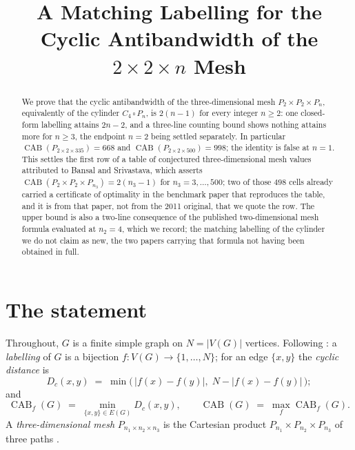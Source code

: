 \documentclass[11pt]{amsart}
\title[Cyclic antibandwidth of $P_2\times P_2\times P_n$]{A Matching Labelling for the Cyclic
Antibandwidth of the \texorpdfstring{$2\times2\times n$}{2x2xn} Mesh}
\date{}
\DeclareMathOperator{\CAB}{CAB}
\newcommand{\Dc}{D_{c}}
\begin{document}
\begin{abstract}
We prove that the cyclic antibandwidth of the three-dimensional mesh $P_2\times P_2\times P_n$,
equivalently of the cylinder $C_4\,\square\,P_n$, is $2(n-1)$ for every integer $n\ge2$: one
closed-form labelling attains $2n-2$, and a three-line counting bound shows nothing attains more
for $n\ge3$, the endpoint $n=2$ being settled separately. In particular
$\CAB(P_{2\times2\times335}) = 668$ and $\CAB(P_{2\times2\times500}) = 998$; the identity is false
at $n=1$. This settles the first row of a table of conjectured three-dimensional mesh values
attributed to Bansal and Srivastava, which asserts
$\CAB(P_2\times P_2\times P_{n_3}) = 2(n_3-1)$ for $n_3 = 3,\dots,500$; two of those $498$ cells
already carried a certificate of optimality in the benchmark paper that reproduces the table, and
it is from that paper, not from the 2011 original, that we quote the row. The upper bound is also a
two-line consequence of the published two-dimensional mesh formula evaluated at $n_2 = 4$, which we
record; the matching labelling of the cylinder we do not claim as new, the two papers carrying that
formula not having been obtained in full.
\end{abstract}

\maketitle

\section{The statement}

Throughout, $G$ is a finite simple graph on $N = |V(G)|$ vertices. Following
\cite[\S2.1]{SAT2026}: a \emph{labelling} of $G$ is a bijection $f\colon V(G)\to\{1,\dots,N\}$; for
an edge $\{x,y\}$ the \emph{cyclic distance} is
\[
  \Dc(x,y) \;=\; \min\bigl(\,|f(x)-f(y)|,\; N-|f(x)-f(y)|\,\bigr);
\]
and
\[
  \CAB_f(G) \;=\; \min_{\{x,y\}\in E(G)} \Dc(x,y),
  \qquad
  \CAB(G) \;=\; \max_{f} \CAB_f(G).
\]
A \emph{three-dimensional mesh} $P_{n_1\times n_2\times n_3}$ is the Cartesian product
$P_{n_1}\times P_{n_2}\times P_{n_3}$ of three paths \cite[Appendix~A]{SAT2026}.
\end{document}
